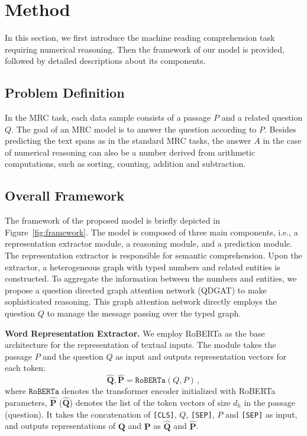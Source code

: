 \documentclass{article}
\begin{document}
\section{Method}
In this section, we first introduce the machine reading comprehension task requiring numerical reasoning. Then the framework of our model is provided, followed by detailed descriptions about its components.

\subsection{Problem Definition}
In the MRC task, each data sample consists of a passage $P$ and a related question $Q$.
The goal of an MRC model is to answer the question according to $P$.
Besides predicting the text spans as in the standard MRC tasks, the answer $A$ in the case of numerical reasoning can also be a number derived from arithmetic computations, such as sorting, counting, addition and subtraction.





\subsection{Overall Framework}
The framework of the proposed model is briefly depicted in Figure~\ref{fig:framework}.
The model is composed of three main components, i.e., a representation extractor module, a reasoning module, and a prediction module.
The representation extractor is responsible for semantic comprehension.
Upon the extractor, a heterogeneous graph with typed numbers and related entities is constructed.
To aggregate the information between the numbers and entities, we propose a question directed graph attention network (QDGAT) to make sophisticated reasoning.
This graph attention network directly employs the question $Q$ to manage the message passing over the typed graph.


{\bf Word Representation Extractor.}
We employ RoBERTa \cite{DBLP:journals/corr/abs-1907-11692} as the base architecture for the representation of textual inputs.
The module takes the passage $P$ and the question $Q$ as input and outputs representation vectors for each token:
\begin{equation}
\hat{\mathbf{Q}}, \hat{\mathbf{P}} =  \mathtt{RoBERTa}({Q}, {P}) \,,
\end{equation}
where $\mathtt{RoBERTa}$ denotes the transformer encoder initialized with RoBERTa  parameters, 
$\hat{\mathbf{P}}$ ($\hat{\mathbf{Q}}$) denotes the list of the token vectors of size $d_h$ in the passage (question).
It takes the concatenation of \texttt{[CLS]}, ${Q}$, \texttt{[SEP]}, ${P}$ and \texttt{[SEP]} as input, and outputs representations of $\mathbf{Q}$ and $\mathbf{P}$ as $\hat{\mathbf{Q}}$ and $\hat{\mathbf{P}}$.  
\end{document}
